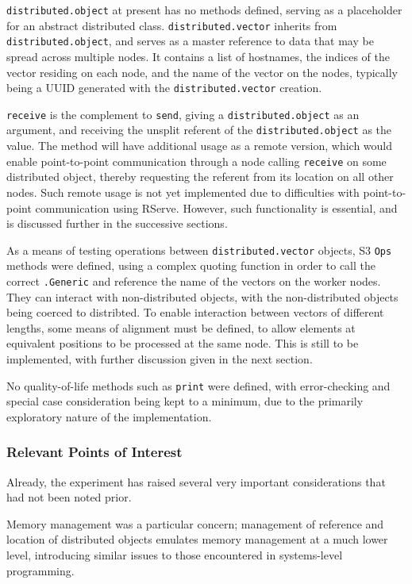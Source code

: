 \texttt{distributed.object} at present has no methods defined, serving
as a placeholder for an abstract distributed class.
\texttt{distributed.vector} inherits from \texttt{distributed.object},
and serves as a master reference to data that may be spread across
multiple nodes. It contains a list of hostnames, the indices of the
vector residing on each node, and the name of the vector on the nodes,
typically being a UUID generated with the \texttt{distributed.vector}
creation.

\texttt{receive} is the complement to \texttt{send}, giving a
\texttt{distributed.object} as an argument, and receiving the unsplit
referent of the \texttt{distributed.object} as the value. The method
will have additional usage as a remote version, which would enable
point-to-point communication through a node calling \texttt{receive} on
some distributed object, thereby requesting the referent from its
location on all other nodes. Such remote usage is not yet implemented
due to difficulties with point-to-point communication using RServe.
However, such functionality is essential, and is discussed further in
the successive sections.

As a means of testing operations between \texttt{distributed.vector}
objects, S3 \texttt{Ops} methods were defined, using a complex quoting
function in order to call the correct \texttt{.Generic} and reference
the name of the vectors on the worker nodes. They can interact with
non-distributed objects, with the non-distributed objects being coerced
to distribted. To enable interaction between vectors of different
lengths, some means of alignment must be defined, to allow elements at
equivalent positions to be processed at the same node. This is still to
be implemented, with further discussion given in the next section.

No quality-of-life methods such as \texttt{print} were defined, with
error-checking and special case consideration being kept to a minimum,
due to the primarily exploratory nature of the implementation.

\hypertarget{relevant-points-of-interest}{%
\subsubsection{Relevant Points of
Interest}\label{relevant-points-of-interest}}

Already, the experiment has raised several very important considerations
that had not been noted prior.

Memory management was a particular concern; management of reference and
location of distributed objects emulates memory management at a much
lower level, introducing similar issues to those encountered in
systems-level programming.

